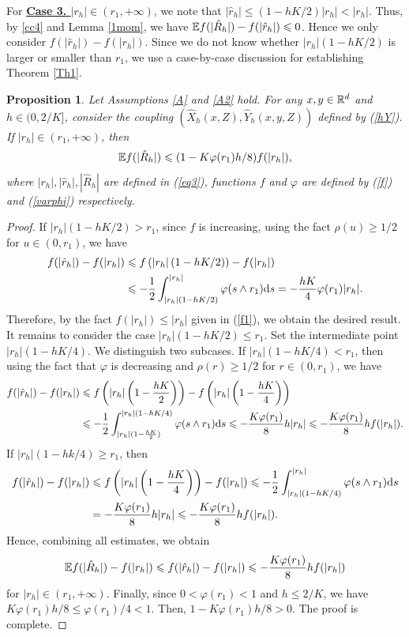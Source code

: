 \documentclass[aap]{imsart}
\theoremstyle{plain}
\newtheorem{proposition}{Proposition}
\theoremstyle{definition}
\begin{document}
For \underline{\bf{Case 3. \textit{$|r_h|\in(r_1, +\infty)$}}}, we note that $|\hat{r}_h|\leqslant (1-hK/2)|r_h|<|r_h|$. Thus, by \eqref{cc4} and Lemma \ref{1mom}, we have $\mathbb{E} f(|\hat{R}_h|)-f(|\hat{r}_h|)\leqslant 0$. Hence we only consider $f(|\hat{r}_h|)-f(|r_h|)$. Since we do not know whether $|r_h|(1-hK/2)$ is larger or smaller than $r_1$,  we use a case-by-case discussion for establishing Theorem \ref{Th1}.
\begin{proposition}\label{PR5}
Let Assumptions \ref{A} and \ref{A2} hold. For any $x, y\in\mathbb{R}^d$ and $h\in(0, 2/K]$, consider the coupling $(\hat{X}_h(x,Z), \hat{Y}_h(x,y,Z))$ defined by (\ref{hY}). If $|r_h|\in(r_1, +\infty)$, then
\begin{equation*}
\mathbb{E} f(|\hat{R}_h|)\leqslant (1-K\varphi(r_1)h/8)f(|r_h|),
\end{equation*}
where $|r_h|, |\hat{r}_h|, |\hat{R}_h|$ are defined in (\ref{eq3}), functions $f$ and $\varphi$ are defined by (\ref{f}) and (\ref{varphi}) respectively.
\end{proposition} 
\begin{proof}
If $|r_h|(1-hK/2)>r_1$, since $f$ is increasing, using the fact $\rho(u)\geqslant 1/2$ for $u\in(0,r_1)$, we have
\begin{align*}
f(|\hat{r}_h|)-f(|r_h|)&\leqslant f\left(|r_h|\left(1-hK/2\right)\right)-f(|r_h|)\\
&\leqslant -\frac{1}{2}\int_{|r_h|(1-hK/2)}^{|r_h|}\varphi(s\wedge r_1)\mathrm{d} s= -\frac{hK}{4}\varphi(r_1)|r_h|.
\end{align*}
Therefore, by the fact $f(|r_h|)\leqslant |r_h|$ given in (\ref{f1}), we obtain the desired result. It remains to consider the case \(|r_h|(1-hK/2)\leqslant r_1\).
Set the intermediate point \(|r_h|(1-hK/4)\).
We distinguish two subcases. If $|r_h|(1-hK/4)< r_1$, then using the fact that $\varphi$ is decreasing and $\rho(r)\geqslant 1/2$ for $r\in(0,r_1)$, we have 
\begin{align*}
f(|\hat{r}_h|)-f(|r_h|)&\leqslant f\left(|r_h|\left(1-\frac{hK}{2}\right)\right)-f\left(|r_h|\left(1-\frac{hK}{4}\right)\right)\\
&\leqslant -\frac{1}{2}\int_{|r_h|(1-\frac{hK}{2})}^{|r_h|(1-hK/4)}\varphi(s\wedge r_1)\mathrm{d} s\leqslant -\frac{K\varphi(r_1)}{8}h|r_h|\leqslant -\frac{K\varphi(r_1)}{8}hf(|r_h|).
\end{align*}
If $|r_h|(1-hk/4)\geqslant r_1$, then 
\begin{align*}
f(|\hat{r}_h|)-f(|r_h|)&\leqslant f\left(|r_h|\left(1-\frac{hK}{4}\right)\right)-f(|r_h|)\leqslant -\frac{1}{2}\int_{|r_h|(1-hK/4)}^{|r_h|}\varphi(s\wedge r_1)\mathrm{d} s\\
&= -\frac{K\varphi(r_1)}{8}h|r_h|\leqslant -\frac{K\varphi(r_1)}{8}hf(|r_h|).
\end{align*}	
Hence, combining all estimates, we obtain
\begin{equation*}
\mathbb{E} f(|\hat{R}_h|)-f(|r_h|)\leqslant f(|\hat{r}_h|)-f(|r_h|)\leqslant  -\frac{K\varphi(r_1)}{8}hf(|r_h|)
\end{equation*}
for $|r_h|\in(r_1, +\infty)$.
Finally, since $0<\varphi(r_1)<1$ and $h\leqslant 2/K$, we have $K\varphi(r_1)h/ 8
\leqslant\varphi(r_1)/4<1$. Then, $1-K\varphi(r_1)h/8>0$. The proof is complete.
\end{proof}
			
\end{document}
